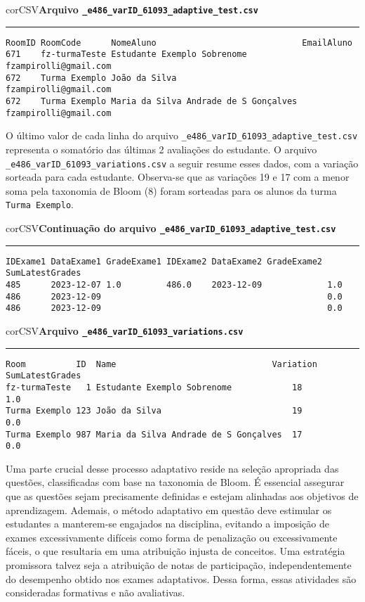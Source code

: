 \begin{myboxCode}{corCSV}{\textbf{Arquivo \texttt{\_e486\_varID\_61093\_adaptive\_test.csv}}}\vspace{3mm}
\hrule
\begin{verbatim}
RoomID RoomCode      NomeAluno                             EmailAluno
671    fz-turmaTeste Estudante Exemplo Sobrenome           fzampirolli@gmail.com 
672    Turma Exemplo João da Silva                         fzampirolli@gmail.com 
672    Turma Exemplo Maria da Silva Andrade de S Gonçalves fzampirolli@gmail.com    
\end{verbatim}
\end{myboxCode}

O último valor de cada linha do arquivo \verb|_e486_varID_61093_adaptive_test.csv| representa o somatório das últimas 2 avaliações do estudante. O arquivo \verb|_e486_varID_61093_variations.csv| a seguir resume esses dados, com a variação sorteada para cada estudante. Observa-se que as variações 19 e 17 com a menor soma pela taxonomia de Bloom (8) foram sorteadas para os alunos da turma \verb|Turma Exemplo|.

\begin{myboxCode}{corCSV}{\textbf{Continuação do arquivo \texttt{\_e486\_varID\_61093\_adaptive\_test.csv}}}\vspace{3mm}
  \hrule
  \begin{verbatim}
IDExame1 DataExame1 GradeExame1 IDExame2 DataExame2 GradeExame2 SumLatestGrades
485      2023-12-07 1.0         486.0    2023-12-09             1.0 
486      2023-12-09                                             0.0 
486      2023-12-09                                             0.0
\end{verbatim}
\end{myboxCode}


\begin{myboxCode}{corCSV}{\textbf{Arquivo \texttt{\_e486\_varID\_61093\_variations.csv}}}\vspace{3mm}
\hrule
\begin{verbatim}
Room          ID  Name                               Variation  SumLatestGrades
fz-turmaTeste   1 Estudante Exemplo Sobrenome            18         1.0
Turma Exemplo 123 João da Silva                          19         0.0
Turma Exemplo 987 Maria da Silva Andrade de S Gonçalves  17         0.0
\end{verbatim}
\end{myboxCode}


Uma parte crucial desse processo adaptativo reside na seleção apropriada das questões, classificadas com base na taxonomia de Bloom. É essencial assegurar que as questões sejam precisamente definidas e estejam alinhadas aos objetivos de aprendizagem. Ademais, o método adaptativo em questão deve estimular os estudantes a manterem-se engajados na disciplina, evitando a imposição de exames excessivamente difíceis como forma de penalização ou excessivamente fáceis, o que resultaria em uma atribuição injusta de conceitos. Uma estratégia promissora talvez seja a atribuição de notas de participação, independentemente do desempenho obtido nos exames adaptativos. Dessa forma, essas atividades são consideradas formativas e não avaliativas.

